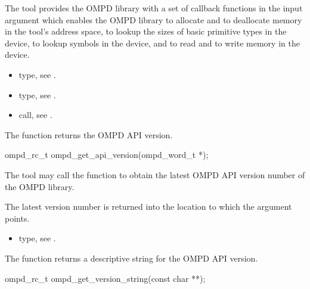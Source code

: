 The tool provides the OMPD library with a set of callback functions in the 
 input argument which enables the OMPD library to allocate and 
to deallocate memory in the tool's address space, to lookup the sizes of basic 
primitive types in the device, to lookup symbols in the device, and to read and 
to write memory in the device.

\crossreferences
\begin{itemize}
\item {} type, see .

\item {} type, see .

\item {} call, 
see .
\end{itemize}



\label{subsubsubsec:ompd_get_api_version}

\summary
The  function returns the OMPD API version.

\format
\begin{cspecific}
\begin{ompSyntax}
ompd_rc_t ompd_get_api_version(ompd_word_t *);
\end{ompSyntax}
\end{cspecific}

\descr
The tool may call the  function to obtain the 
latest OMPD API version number of the OMPD library.

\argdesc
The latest version number is returned into the location to which the 
 argument points.

\crossreferences
\begin{itemize}
\item {} type, see .
\end{itemize}



\label{subsubsubsec:ompd_get_version_string}

\summary
The  function returns a descriptive 
string for the OMPD API version.

\format
\begin{cspecific}
\begin{ompSyntax}
ompd_rc_t ompd_get_version_string(const char **);
\end{ompSyntax}
\end{cspecific}



